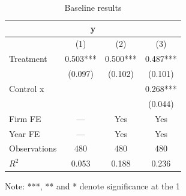 \begin{table}[htbp]
\centering
\caption{Baseline results}
\label{tab:main}
\begin{tabular}{lccc}
\toprule
\multicolumn{4}{c}{y} \\
\midrule
 & (1) & (2) & (3) \\
\midrule
Treatment & 0.503*** & 0.500*** & 0.487*** \\
 & (0.097) & (0.102) & (0.101) \\
\addlinespace[0.3ex]
Control x &  &  & 0.268*** \\
 &  &  & (0.044) \\
\addlinespace[0.3ex]
\midrule
Firm FE & --- & Yes & Yes \\
Year FE & --- & Yes & Yes \\
\addlinespace[0.3ex]
\midrule
Observations & 480 & 480 & 480 \\
$R^2$ & 0.053 & 0.188 & 0.236 \\
\bottomrule
\end{tabular}
\par\smallskip\footnotesize Note: ***, ** and * denote significance at the 1%
\end{table}
